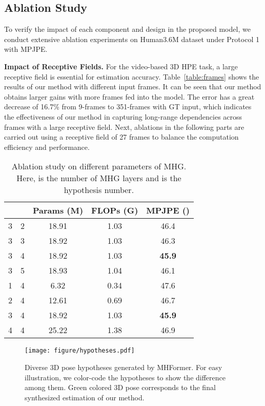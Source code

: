 \documentclass[10pt,twocolumn,letterpaper]{article}
\def\VspaceL{\vspace{-0.40cm}}
\def\VspaceS{\vspace{-0.30cm}}
\begin{document}
\subsection{Ablation Study}
To verify the impact of each component and design in the proposed model, we conduct 
extensive ablation experiments on Human3.6M dataset under Protocol 1 with MPJPE. 

\noindent
\textbf{Impact of Receptive Fields.}
For the video-based 3D HPE task, a large receptive field is essential for estimation accuracy. 
Table~\ref{table:frames} shows the results of our method with different input frames. 
It can be seen that our method obtains larger gains with more frames fed into the model.  
The error has a great decrease of 16.7\% from 9-frames to 351-frames with GT input, which indicates the effectiveness of our method in capturing long-range dependencies across frames with a large receptive field. 
Next, ablations in the following parts are carried out using a receptive field of 27 frames to balance the computation efficiency and performance.

\begin{table}[tb]
  \centering  
  \footnotesize
  \caption
  {
    Ablation study on different parameters of MHG. 
    Here,  is the number of MHG layers and  is the hypothesis number. 
  }
  \setlength{\tabcolsep}{3.30mm}  
  \begin{tabular}{ccccc}
    \toprule [1pt]
     &  &Params (M) &FLOPs (G) &MPJPE () \\
    \midrule [0.5pt]
    3& 2& 18.91& 1.03& 46.4 \\
    3& 3& 18.92& 1.03& 46.3 \\
    3& 4& 18.92& 1.03& \textbf{45.9} \\
    3& 5& 18.93& 1.04& 46.1 \\
\midrule [0.5pt]
    1& 4& 6.32& 0.34& 47.6 \\
    2& 4& 12.61& 0.69& 46.7 \\
    3& 4& 18.92& 1.03& \textbf{45.9} \\
    4& 4& 25.22& 1.38& 46.9 \\
    \toprule [1pt]
  \end{tabular}
  \label{table:MHG}
  \VspaceL
\end{table}

\begin{figure*}[htb]
  \centering
  \texttt{[image: figure/hypotheses.pdf]}
  \caption
  {Diverse 3D pose hypotheses generated by MHFormer. 
  For easy illustration, we color-code the hypotheses to show the difference among them. 
  Green colored 3D pose corresponds to the final synthesized estimation of our method. 
  }
  \label{fig:hypotheses}
  \VspaceS
\end{figure*}
\end{document}
